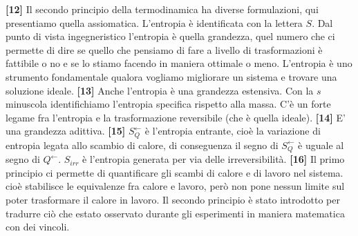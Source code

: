 \newline\textbf{[12]}\; Il secondo principio della termodinamica ha diverse formulazioni, qui presentiamo quella assiomatica. L'entropia è identificata con la lettera $S$. Dal punto di vista ingegneristico l'entropia è quella grandezza, quel numero che ci permette di dire se quello che pensiamo di fare a livello di trasformazioni è fattibile o no e se lo stiamo facendo in maniera ottimale o meno. L'entropia è uno strumento fondamentale qualora vogliamo migliorare un sistema e trovare una soluzione ideale.
\newline\textbf{[13]}\; Anche l'entropia è una grandezza estensiva. Con la $s$ minuscola identifichiamo l'entropia specifica rispetto alla massa. C'è un forte legame fra l'entropia e la trasformazione reversibile (che è quella ideale).
\newline\textbf{[14]}\; E' una grandezza adittiva.
\newline\textbf{[15]}\; $S_Q^{\leftarrow  }$ è l'entropia entrante, cioè la variazione di entropia legata allo scambio di calore, di conseguenza il segno di $S_Q^{\leftarrow  }$ è uguale al segno di $Q^{\leftarrow }$. $S_{irr}$ è l'entropia generata per via delle irreversibilità.
\newline\textbf{[16]}\; Il primo principio ci permette di quantificare gli scambi di calore e di lavoro nel sistema. cioè stabilisce le equivalenze fra calore e lavoro, però non pone nessun limite sul poter trasformare il calore in lavoro. Il secondo principio è stato introdotto per tradurre ciò che estato osservato durante gli esperimenti in maniera matematica con dei vincoli.
